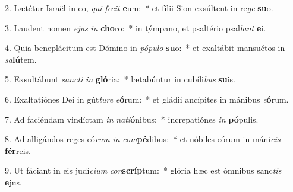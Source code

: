 2. Lætétur Israël in eo, \textit{qui} \textit{fe}\textit{cit} \textbf{e}um:~*  et fílii Sion exsúltent in re\textit{ge} \textbf{su}o.\

3. Laudent nomen \textit{e}\textit{jus} \textit{in} \textbf{cho}ro:~*  in týmpano, et psaltério psal\textit{lant} \textbf{e}i.\

4. Quia beneplácitum est Dómino in \textit{pó}\textit{pu}\textit{lo} \textbf{su}o:~*  et exaltábit mansuétos in \textit{sa}\textbf{lú}tem.\

5. Exsultábunt \textit{sanc}\textit{ti} \textit{in} \textbf{gló}ria:~*  lætabúntur in cubíli\textit{bus} \textbf{su}is.\

6. Exaltatiónes Dei in gút\textit{tu}\textit{re} \textit{e}\textbf{ó}rum:~*  et gládii ancípites in mánibus \textit{e}\textbf{ó}rum.\

7. Ad faciéndam vindíctam \textit{in} \textit{na}\textit{ti}\textbf{ó}nibus:~*  increpatiónes \textit{in} \textbf{pó}pulis.\

8. Ad alligándos reges eó\textit{rum} \textit{in} \textit{com}\textbf{pé}dibus:~*  et nóbiles eórum in máni\textit{cis} \textbf{fér}reis.\

9. Ut fáciant in eis judí\textit{ci}\textit{um} \textit{con}\textbf{scríp}tum:~*  glória hæc est ómnibus sanc\textit{tis} \textbf{e}jus.\

